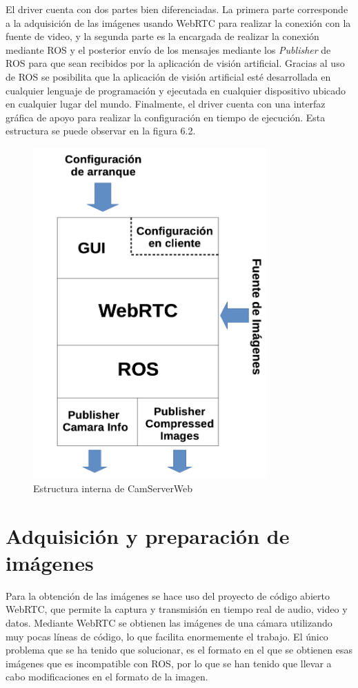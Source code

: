 El driver cuenta con dos partes bien diferenciadas. La primera parte corresponde a la adquisición de las imágenes usando WebRTC para realizar la conexión con la fuente de video, y la segunda parte es la encargada de realizar la conexión mediante ROS y el posterior envío de los mensajes mediante los \textit{Publisher} de ROS para que sean recibidos por la aplicación de visión artificial. Gracias al uso de ROS se posibilita que la aplicación de visión artificial esté desarrollada en cualquier lenguaje de programación y ejecutada en cualquier dispositivo ubicado en cualquier lugar del mundo. Finalmente, el driver cuenta con una interfaz gráfica de apoyo para realizar la configuración en tiempo de ejecución. Esta estructura se puede observar en la figura 6.2.
\begin{figure}[H]
  \begin{center}
    \includegraphics[width=0.8\textwidth]{figures/cajablancacamserver.png}
		\caption{Estructura interna de CamServerWeb}
		\label{fig.estructuracamserver}
		\end{center}
\end{figure}

\section{Adquisición y preparación de imágenes}
Para la obtención de las imágenes se hace uso del proyecto de código abierto WebRTC, que permite la captura y transmisión en tiempo real de audio, video y datos.
Mediante WebRTC se obtienen las imágenes de una cámara utilizando muy pocas líneas de código, lo que facilita enormemente el trabajo. El único problema que se ha tenido que solucionar, es el formato en el que se obtienen esas imágenes que es incompatible con ROS, por lo que se han tenido que llevar a cabo modificaciones en el formato de la imagen.

